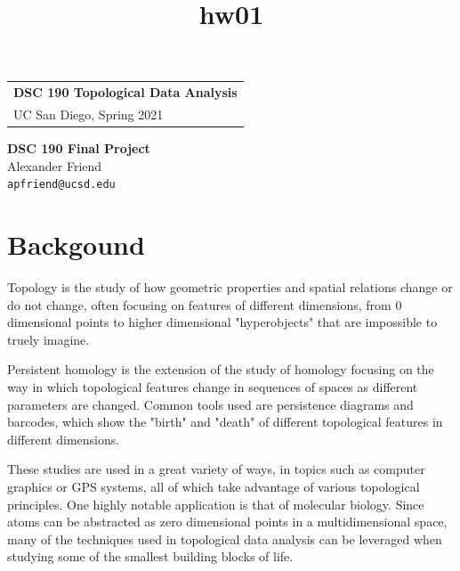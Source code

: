\documentclass[12pt]{article}
\title{hw01}
\begin{document}
    
    
    \thispagestyle{empty} %

    \begin{tabular}{p{15.5cm}} %
    {\large \bf DSC 190 Topological Data Analysis} \\
    UC San Diego, Spring 2021  \\
    \hline %
    \end{tabular} %

    \vspace*{0.3cm} %

    \begin{center} %
        {\Large \bf DSC 190 Final Project}\\ %
        \vspace{2mm}
        Alexander Friend\\
        \texttt{apfriend@ucsd.edu}
    \end{center} 
    \vspace{0.2cm}


    \section{Backgound }
        \label{sec:background}
        Topology is the study of how geometric properties and spatial relations change or do not change, often focusing on features of different
        dimensions, from 0 dimensional points to higher dimensional "hyperobjects" that are impossible to truely imagine.

        Persistent homology is the extension of the study of homology focusing on the way in which topological features change
        in sequences of spaces as different parameters are changed. Common tools used are persistence diagrams and barcodes, which
        show the "birth" and "death" of different topological features in different dimensions.

        These studies are used in a great variety of ways, in topics such as computer graphics or GPS systems, all of which take advantage
        of various topological principles. One highly notable application is that of molecular biology. Since atoms can be abstracted as zero 
        dimensional points in a multidimensional space, many of the techniques used in topological data analysis can be leveraged when studying 
        some of the smallest building blocks of life.
\end{document}
